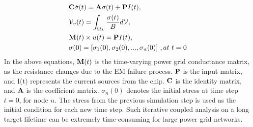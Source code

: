 \begin{align}
	\label{eq:em}
	\begin{split}
		&{\bf C} \dot{\sigma}(t)  = {\bf A} \sigma(t) + {\bf P}I(t),  \\
		&\mathcal{V}_v(t)  = \int_{\Omega_L}\frac{\sigma(t)}{B}d\mathcal{V},  \\ 
		&{\bf M}(t) \times u(t)  = {\bf P} I(t), \\
		&{\bf \sigma}(0)  = [\sigma_1(0), \sigma_2(0), ..., \sigma_n(0)] \,\, ,at \,\, t = 0 
	\end{split}
\end{align}
In the above equations, ${\bf M}(t)$ is the time-varying power grid conductance matrix, as the resistance changes due to the EM failure process. ${{\bf P}}$ is the input matrix, and I(t) represents the current sources from the chip. ${{\bf C}}$ is the identity matrix, and ${{\bf A}}$ is the coefficient matrix. $\sigma_{n}(0)$ denotes the initial stress at time step $t = 0$, for node $n$. The stress from the previous simulation step is used as the initial condition for each new time step. Such iterative coupled analysis on a long target lifetime can be extremely time-consuming for large power grid networks.

